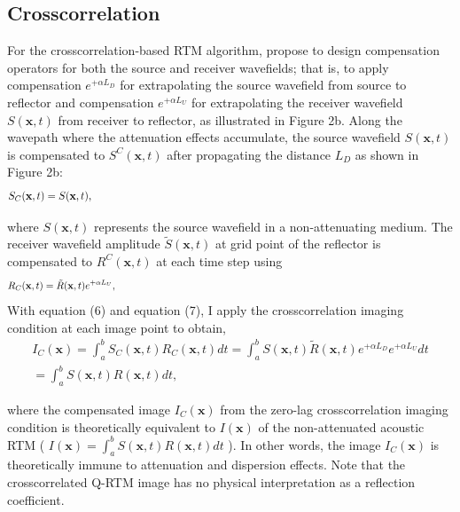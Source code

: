 \subsection{Crosscorrelation}
For the crosscorrelation-based RTM algorithm, \citet[]{zhu14d} propose to design compensation operators for both the source and receiver wavefields; that is, to apply compensation  $e^{+\alpha L_D}$ for extrapolating the source wavefield  from source to reflector and compensation  $ e^{+\alpha L_U}$ for extrapolating the receiver wavefield $S(\mathbf{x},t)$ from receiver to reflector, as illustrated in Figure 2b. Along the wavepath where the attenuation effects accumulate, the source wavefield  $S(\mathbf{x},t)$ is compensated to $S^{C}(\mathbf{x},t)$  after propagating the distance $L_D$  as shown in Figure 2b:
\begin{equation}
\label{eq:eq6}                      
\hspace{0pt} S_{C}(\mathbf{x},t)=S(\mathbf{x},t),\hspace{\linewidth minus\linewidth}
\end{equation}

where $S(\mathbf{x},t)$  represents the source wavefield in a non-attenuating medium. The receiver wavefield amplitude  $\tilde{S}(\mathbf{x},t)$ at grid point of the reflector is compensated to $R^{C}(\mathbf{x},t)$  at each time step using
\begin{equation}
\label{eq:eq7}                      
\hspace{0pt} R_{C}(\mathbf{x},t)=\tilde{R}(\mathbf{x},t)e^{+\alpha L_U},\hspace{\linewidth minus\linewidth}
\end{equation}
With equation (6) and equation (7), I apply the crosscorrelation imaging condition at each image point to obtain, 
\begin{eqnarray}
\label{eq:eq8}                      
I_{C}(\mathbf{x})=\int_{a}^{b} S_{C}(\mathbf{x},t)R_{C}(\mathbf{x},t) dt = \int_{a}^{b} S(\mathbf{x},t) \tilde{R}(\mathbf{x},t) e^{+\alpha L_D}e^{+\alpha L_U}dt \\
= \int_{a}^{b} S(\mathbf{x},t) R(\mathbf{x},t) dt,\nonumber
\end{eqnarray}

where the compensated image $I_{C}(\mathbf{x})$  from the zero-lag crosscorrelation imaging condition is theoretically equivalent to  $I(\mathbf{x})$  of the non-attenuated acoustic RTM ( $I(\mathbf{x})=\int_{a}^{b} S(\mathbf{x},t) R(\mathbf{x},t) dt$ ). In other words, the image $I_{C}(\mathbf{x})$   is theoretically immune to attenuation and dispersion effects. Note that the crosscorrelated Q-RTM image has no physical interpretation as a reflection coefficient. 

